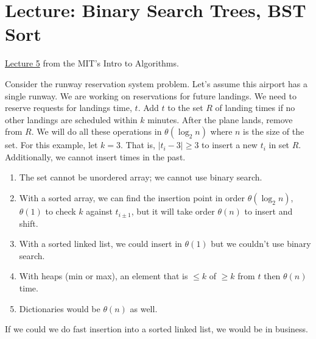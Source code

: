 \chapter{Lecture: Binary Search Trees, BST Sort}
\href{https://ocw.mit.edu/courses/electrical-engineering-and-computer-science/6-006-introduction-to-algorithms-fall-2011/lecture-videos/lecture-5-binary-search-trees-bst-sort/}{Lecture 5} from the MIT's 
Intro to Algorithms.

Consider the runway reservation system problem. Let's assume this airport has a single runway. We are working 
on reservations for future landings. We need to reserve requests for landings time, \(t\). Add \(t\) to the set \(R\) of
landing times if no other landings are scheduled within \(k\) minutes. After the plane lands, remove from \(R\).
We will do all these operations in \(\theta(\log_2 n)\) where \(n\) is the size of the set. For this example, let \(k = 3\).
That is, \(\lvert t_i - 3\rvert\geq 3\) to insert a new \(t_i\) in set \(R\). Additionally, we cannot insert times in the past.
\begin{enumerate}
	\item The set cannot be unordered array; we cannot use binary search.
	\item With a sorted array, we can find the insertion point in order \(\theta(\log_2 n)\), \(\theta(1)\) to check \(k\)
	against \(t_{i\pm 1}\), but it will take order \(\theta(n)\) to insert and shift.
	\item With a sorted linked list, we could insert in \(\theta(1)\) but we couldn't use binary search.
	\item With heaps (min or max), an element that is \(\leq k\) of \(\geq k\) from \(t\) then \(\theta(n)\) time.
	\item Dictionaries would be \(\theta(n)\) as well.
\end{enumerate}
If we could we do fast insertion into a sorted linked list, we would be in business.

